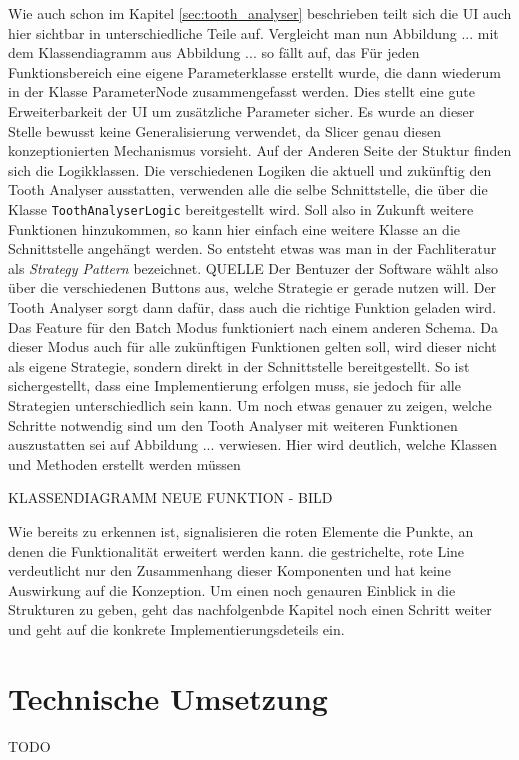 Wie auch schon im Kapitel \ref{sec:tooth_analyser} beschrieben teilt sich die
\ac{UI} auch hier sichtbar in unterschiedliche Teile auf. Vergleicht man nun
Abbildung ... mit dem Klassendiagramm aus Abbildung ... so fällt auf, das Für jeden
Funktionsbereich eine eigene Parameterklasse erstellt wurde, die dann wiederum
in der Klasse ParameterNode zusammengefasst werden. Dies stellt eine gute Erweiterbarkeit
der \ac{UI} um zusätzliche Parameter sicher. Es wurde an dieser Stelle bewusst keine
Generalisierung verwendet, da Slicer genau diesen konzeptionierten Mechanismus
vorsieht. Auf der Anderen Seite der Stuktur finden sich die Logikklassen. Die
verschiedenen Logiken die aktuell und zukünftig den Tooth Analyser ausstatten, verwenden
alle die selbe Schnittstelle, die über die Klasse \texttt{ToothAnalyserLogic} bereitgestellt
wird. Soll also in Zukunft weitere Funktionen hinzukommen, so kann hier einfach eine
weitere Klasse an die Schnittstelle angehängt werden. So entsteht etwas was man
in der Fachliteratur als \textit{Strategy Pattern} bezeichnet. QUELLE Der
Bentuzer der Software wählt also über die verschiedenen Buttons aus, welche Strategie
er gerade nutzen will. Der Tooth Analyser sorgt dann dafür, dass auch die richtige
Funktion geladen wird. Das Feature für den Batch Modus funktioniert nach einem
anderen Schema. Da dieser Modus auch für alle zukünftigen Funktionen gelten soll,
wird dieser nicht als eigene Strategie, sondern direkt in der Schnittstelle bereitgestellt.
So ist sichergestellt, dass eine Implementierung erfolgen muss, sie jedoch für
alle Strategien unterschiedlich sein kann. Um noch etwas genauer zu zeigen,
welche Schritte notwendig sind um den Tooth Analyser mit weiteren Funktionen
auszustatten sei auf Abbildung ... verwiesen. Hier wird deutlich, welche Klassen
und Methoden erstellt werden müssen

KLASSENDIAGRAMM NEUE FUNKTION - BILD

Wie bereits zu erkennen ist, signalisieren die roten Elemente die Punkte, an
denen die Funktionalität erweitert werden kann. die gestrichelte, rote Line
verdeutlicht nur den Zusammenhang dieser Komponenten und hat keine Auswirkung
auf die Konzeption. Um einen noch genauren Einblick in die Strukturen zu geben,
geht das nachfolgenbde Kapitel noch einen Schritt weiter und geht auf die
konkrete Implementierungsdeteils ein.


\section{Technische Umsetzung}
\label{sec:technische_umsetzung} TODO


